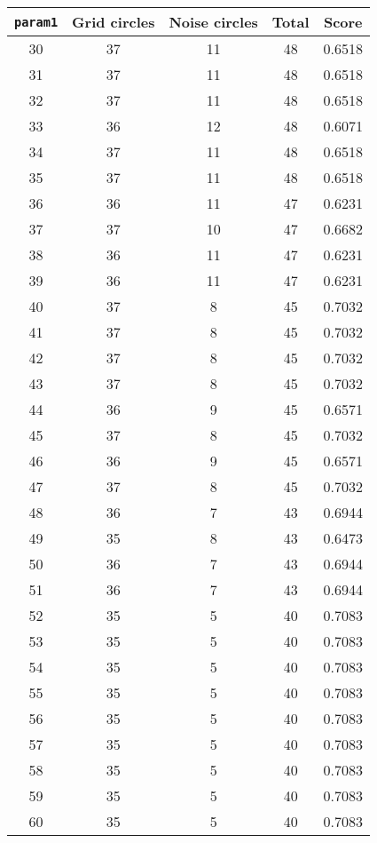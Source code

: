 \documentclass[letterpaper, 12pt]{article}
\begin{document}
\begin{longtable}{|c|c|c|c|c|}
\hline
\textbf{\texttt{param1}} & \textbf{Grid circles} & \textbf{Noise circles} & \textbf{Total} & \textbf{Score} \\
\hline
30 & 37 & 11 & 48 & 0.6518 \\
\hline
31 & 37 & 11 & 48 & 0.6518 \\
\hline
32 & 37 & 11 & 48 & 0.6518 \\
\hline
33 & 36 & 12 & 48 & 0.6071 \\
\hline
34 & 37 & 11 & 48 & 0.6518 \\
\hline
35 & 37 & 11 & 48 & 0.6518 \\
\hline
36 & 36 & 11 & 47 & 0.6231 \\
\hline
37 & 37 & 10 & 47 & 0.6682 \\
\hline
38 & 36 & 11 & 47 & 0.6231 \\
\hline
39 & 36 & 11 & 47 & 0.6231 \\
\hline
40 & 37 & 8 & 45 & 0.7032 \\
\hline
41 & 37 & 8 & 45 & 0.7032 \\
\hline
42 & 37 & 8 & 45 & 0.7032 \\
\hline
43 & 37 & 8 & 45 & 0.7032 \\
\hline
44 & 36 & 9 & 45 & 0.6571 \\
\hline
45 & 37 & 8 & 45 & 0.7032 \\
\hline
46 & 36 & 9 & 45 & 0.6571 \\
\hline
47 & 37 & 8 & 45 & 0.7032 \\
\hline
48 & 36 & 7 & 43 & 0.6944 \\
\hline
49 & 35 & 8 & 43 & 0.6473 \\
\hline
50 & 36 & 7 & 43 & 0.6944 \\
\hline
51 & 36 & 7 & 43 & 0.6944 \\
\hline
52 & 35 & 5 & 40 & 0.7083 \\
\hline
53 & 35 & 5 & 40 & 0.7083 \\
\hline
54 & 35 & 5 & 40 & 0.7083 \\
\hline
55 & 35 & 5 & 40 & 0.7083 \\
\hline
56 & 35 & 5 & 40 & 0.7083 \\
\hline
57 & 35 & 5 & 40 & 0.7083 \\
\hline
58 & 35 & 5 & 40 & 0.7083 \\
\hline
59 & 35 & 5 & 40 & 0.7083 \\
\hline
60 & 35 & 5 & 40 & 0.7083 \\
\hline

\end{longtable}
\end{document}
